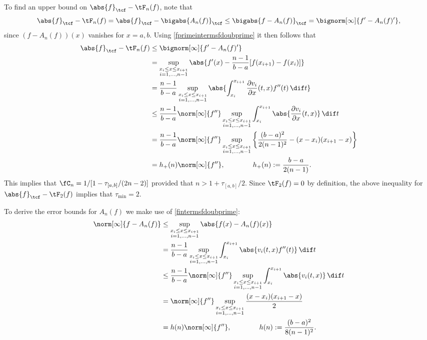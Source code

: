 \documentclass[]{elsarticle}
\theoremstyle{definition}
\theoremstyle{remark}
\newcommand{\Ftnorm}[1]{\abs{#1}_{\tcf}}
\begin{document}
To find an upper bound on $\Ftnorm{f}-\tF_{n}(f)$, note that
\begin{equation*}
\Ftnorm{f} - \tF_{n}(f) = \Ftnorm{f} - \bigabs{A_n(f)}_{\tcf} \le \bigabs{f-A_n(f)}_{\tcf} = \bignorm[\infty]{f' -A_n(f)'},
\end{equation*}
since $(f-A_n(f))(x)$ vanishes for $x=a,b$. Using \eqref{fprimeintermsfdoubprime} it then follows that
\begin{align*}
\Ftnorm{f} - \tF_{n}(f) & \le \bignorm[\infty]{f' -A_n(f)'} \\
& = \sup_{\substack{x_i \le x \le x_{i+1}\\ i=1, \ldots, n-1 }} \abs{f'(x) -\frac{n-1}{b-a}[f(x_{i+1})-f(x_i)]} \\
&=\frac{n-1}{b-a} \sup_{\substack{x_i \le x \le x_{i+1}\\ i=1, \ldots, n-1 }} \abs{ \int_{x_i}^{x_{i+1}} \frac{\partial v_i}{\partial x}(t,x) f''(t) \, \dif t} \\
& \le \frac{n-1}{b-a} \norm[\infty]{f''} \sup_{\substack{x_i \le x \le x_{i+1}\\ i=1, \ldots, n-1 }} \int_{x_i}^{x_{i+1}} \abs{\frac{\partial v_i}{\partial x}(t,x)} \, \dif t \\
&=\frac{n-1}{b-a}\norm[\infty]{f''} \sup_{\substack{x_i \le x \le x_{i+1}\\ i=1, \ldots, n-1 }} \left \{\frac{(b-a)^2}{2(n-1)^2} - (x-x_i)(x_{i+1}-x) \right\} \\
&= h_+(n) \norm[\infty]{f''}, \qquad \qquad  h_+(n):= \frac{b-a}{2(n-1)}.
\end{align*}
This implies that $\fC_n =1/[1 - \tau_{[a,b]}/(2n-2)]$ provided that $n>1+\tau_{[a,b]}/2$.
Since $\tF_2(f)=0$ by definition, the above inequality for $\Ftnorm{f} - \tF_{2}(f)$ implies that $\tau_{\min}=2$.

To derive the error bounds for $A_n(f)$ we make use of \eqref{fintermsfdoubprime}:
\begin{align*}
\norm[\infty]{f-A_n(f)}
& \le \sup_{\substack{x_i \le x \le x_{i+1}\\ i=1, \ldots, n-1 }} \abs{f(x)-A_n (f)(x)}\\
&= \frac{n-1}{b-a}\sup_{\substack{x_i \le x \le x_{i+1}\\ i=1, \ldots, n-1 }}  \int_{x_i}^{x_{i+1}} \abs{v_i(t,x) f''(t)} \, \dif t\\
&\le \frac{n-1}{b-a}\norm[\infty]{f''} \sup_{\substack{x_i \le x \le x_{i+1}\\ i=1, \ldots, n-1 }}  \int_{x_i}^{x_{i+1}} \abs{v_i(t,x)} \, \dif t\\
&=\norm[\infty]{f''} \sup_{\substack{x_i \le x \le x_{i+1}\\ i=1, \ldots, n-1 }}  \frac{(x-x_i)(x_{i+1}-x)}2 \\
&= h(n) \norm[\infty]{f''}, \qquad \qquad  h(n):= \frac{(b-a)^2}{8(n-1)^2}.
\end{align*}
\end{document}
